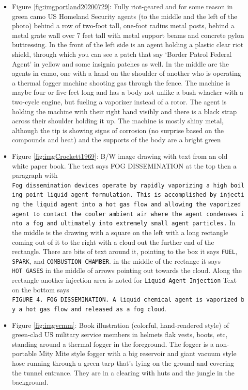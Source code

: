 \documentclass[
  11pt,
]{krantz}
\begin{document}
\begin{itemize}
\item
  Figure \ref{fig:imgportland20200729}: Fully riot-geared and for some reason in green camo US Homeland Security agents (to the middle and the left of the photo) behind a row of two-foot tall, one-foot radius metal posts, behind a metal grate wall over 7 feet tall with metal support beams and concrete pylon buttressing. In the front of the left side is an agent holding a plastic clear riot shield, through which you can see a patch that say `Border Patrol Federal Agent' in yellow and some insignia patches as well. In the middle are the agents in camo, one with a hand on the shoulder of another who is operating a thermal fogger machine shooting gas through the fence. The machine is maybe four or five feet long and has a body not unlike a bush whacker with a two-cycle engine, but fueling a vaporizer instead of a rotor. The agent is holding the machine with their right hand visibly and there is a black strap across their shoulder holding it up. The machine is mostly shiny metal, although the tip is showing signs of corrosion (no surprise based on the compounds and heat) and the supports of the body are a bright green
\item
  Figure \ref{fig:imgCrockett1969}: B/W image drawing with text from an old white paper book. The text says FOG DISSEMINATION at the top then a paragraph with \texttt{Fog\ dissemination\ devices\ operate\ by\ rapidly\ vaporizing\ a\ high\ boiling\ point\ liquid\ agent\ formulation.\ This\ is\ accomplished\ by\ injecting\ the\ liquid\ agent\ into\ a\ hot\ gas\ flow\ and\ allowing\ the\ vaporized\ agent\ to\ contact\ the\ cooler\ ambient\ air\ where\ the\ agent\ condenses\ into\ a\ fog\ and\ ultimately\ into\ extremely\ small\ agent\ particles.} In the middle is the drawing with a square on the left with a long rectangle coming out of it to the right with a cloud out the further end of the rectangle. There are bits of text around it, pointing to the box it says \texttt{FUEL}, \texttt{SPARK}, and \texttt{COMBUSTION\ CHAMBER}. in the middle of the rectange it says \texttt{HOT\ GASES} in the middle of arrows pointing out towards the cloud. Along the rectangle another injection area is noted for \texttt{Liquid\ Agent\ Injection} Text on the bottom says \texttt{FIGURE\ 4.\ FOG\ DISSEMINATION.\ A\ liquid\ chemical\ agent\ is\ vaporized\ by\ a\ hot\ gas\ flow\ and\ released\ as\ a\ fog\ cloud}.
\item
  Figure \ref{fig:imgvcmm}: Book illustration (colorful, hand-rendered style) of green-clad US military service members in helmets flak vests, boots, etc, standing around a thermal fogger in the foreground. The fogger is a non-portable Mity Mite style fogger with a big reservoir and giant vacuum style hose running through a green tarp that's lying on the ground and covering the tunnel entrance. They are in a clearing with huts and the jungle in the background.

\end{itemize}
\end{document}
